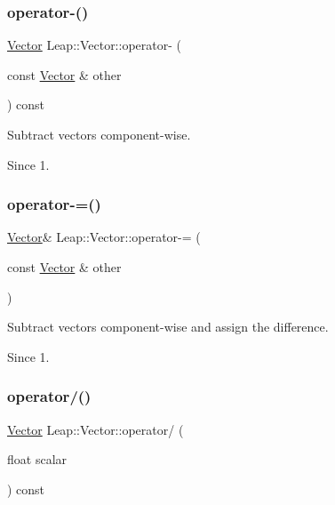 \subsubsection{\texorpdfstring{operator-\/()}{operator-()}\hspace{0.1cm}{\footnotesize\ttfamily [2/2]}}
{\footnotesize\ttfamily \hyperlink{struct_leap_1_1_vector}{Vector} Leap\+::\+Vector\+::operator-\/ (\begin{DoxyParamCaption}\item[{const \hyperlink{struct_leap_1_1_vector}{Vector} \&}]{other }\end{DoxyParamCaption}) const\hspace{0.3cm}{\ttfamily [inline]}}

Subtract vectors component-\/wise.


\begin{DoxyCodeInclude}
\end{DoxyCodeInclude}
 \begin{DoxySince}{Since}
1. 
\end{DoxySince}
\mbox{\label{struct_leap_1_1_vector_a71f56cf12c752f001d44c6a9ed3c15db}} 
\subsubsection{\texorpdfstring{operator-\/=()}{operator-=()}}
{\footnotesize\ttfamily \hyperlink{struct_leap_1_1_vector}{Vector}\& Leap\+::\+Vector\+::operator-\/= (\begin{DoxyParamCaption}\item[{const \hyperlink{struct_leap_1_1_vector}{Vector} \&}]{other }\end{DoxyParamCaption})\hspace{0.3cm}{\ttfamily [inline]}}

Subtract vectors component-\/wise and assign the difference. \begin{DoxySince}{Since}
1. 
\end{DoxySince}
\mbox{\label{struct_leap_1_1_vector_ac5cac29894a104d7e5b46a10d19f423e}} 
\subsubsection{\texorpdfstring{operator/()}{operator/()}}
{\footnotesize\ttfamily \hyperlink{struct_leap_1_1_vector}{Vector} Leap\+::\+Vector\+::operator/ (\begin{DoxyParamCaption}\item[{float}]{scalar }\end{DoxyParamCaption}) const\hspace{0.3cm}{\ttfamily [inline]}}


